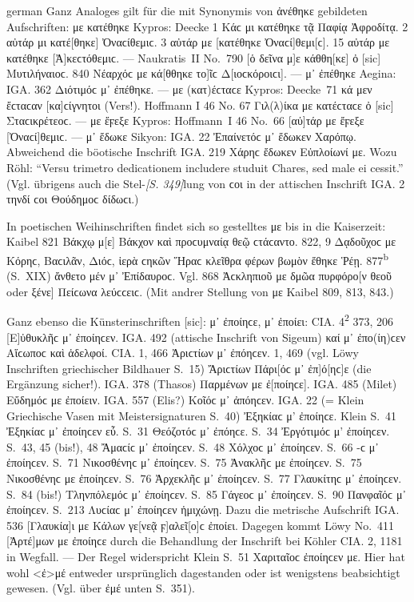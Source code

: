 \begin{otherlanguage*}{german}
Ganz Analoges gilt für die mit Synonymis von ἀνέθηκε gebildeten Aufschriften: με κατέθηκε Kypros: Deecke 1 Κάϲ μι κατέθηκε τᾷ Παφίᾳ Ἀφροδίτᾳ. 2 αὐτάρ μι κατέ[θηκε] Ὀναϲίθεμιϲ. 3 αὐτάρ με [κατέθηκε Ὀναϲί]θεμι[ϲ]. 15 αὐτάρ με κατέθηκε [Ἀ]κεϲτόθεμιϲ. — Naukratis~II No.~790 [ὁ δεῖνα μ]ε κάθθη[κε] ὀ [sic] Μυτιλήναιοϲ. 840 Νέαρχόϲ με κά[θθηκε το]ῖϲ Δ[ιοϲκόροιϲι]. — μ᾽ ἐπέθηκε Aegina: IGA. 362 Διότιμόϲ μ᾽ ἐπέθηκε. — με (κατ)έϲταϲε Kypros: \mbox{Deecke}~71 κά μεν ἔϲταϲαν [κα]ϲίγνη\-τοι (Vers!). Hoffmann I 46 No. 67 Γιλ(λ)ίκα με κατέϲταϲε ὀ [sic] Σταϲικρέτεοϲ. — με ἔϝεξε Kypros: Hoffmann~I 46 No.~66 [αὐ]τάρ με ἔϝεξε [Ὀναϲί]θεμιϲ. — μ᾽ ἔδωκε Sikyon: IGA. 22 Ἐπαίνετόϲ μ᾽ ἔδωκεν Χαρόπῳ. Abweichend die böotische Inschrift IGA. 219 Χάρηϲ ἔδωκεν Εὐπλοίωνί με. Wozu Röhl: “Versu trimetro dedicationem includere studuit Chares, sed male ei cessit.” (Vgl. übrigens auch die Stel-\hypertarget{p349}{\emph{[S. 349]}}\label{p349}lung von ϲοι in der attischen Inschrift IGA. 2 τηνδί ϲοι Θούδημοϲ δίδωϲι.)

In poetischen Weihinschriften findet sich so gestelltes με bis in die Kaiserzeit: Kaibel 821 Βάκχῳ μ[ε] Βάκχον καὶ προϲυμναίᾳ θεῷ ϲτάϲαντο. 822, 9 Δᾳδοῦχοϲ με Κόρηϲ, Βαϲιλᾶν, Διόϲ, ἱερὰ ϲηκῶν Ἥραϲ κλεῖθρα φέρων βωμὸν ἔθηκε Ῥέῃ. 877\textsuperscript{b} (S.~XIX) ἄνθετο μέν μ᾽ Ἐπίδαυροϲ. Vgl. 868 Ἀϲκληπιοῦ με δμῶα πυρφόρο[ν θεοῦ oder ξένε] Πείϲωνα λεύϲϲειϲ. (Mit andrer Stellung von με Kaibel 809, 813, 843.)

Ganz ebenso die Künsterinschriften [sic]: μ᾽ ἐποίηϲε, μ᾽ ἐποίει: CIA. 4\textsuperscript{2} 373, 206 [Ε]ὐθυκλῆϲ μ᾽ ἐποίηϲεν. IGA. 492 (attische Inschrift von Sigeum) καί μ᾽ ἐπο(ίη)ϲεν Αἵϲωποϲ καὶ ἁδελφοί. CIA. 1, 466 Ἀριϲτίων μ᾽ ἐπόηϲεν. 1, 469 (vgl. Löwy Inschriften griechischer Bildhauer S.~15) Ἄριϲτίων Πάρι[όϲ μ᾽ ἐπ]ό[ηϲ]ε (die Ergänzung sicher!). IGA. 378 (Thasos) Παρμένων με ἐ[ποίηϲε]. IGA. 485 (Milet) Εὔδημόϲ με ἐποίειν. IGA. 557 (Elis?) Κοῖόϲ μ᾽ ἀπόηϲεν. IGA. 22 (= Klein Griechische Vasen mit Meistersignaturen S.~40) Ἐξηκίαϲ μ’ ἐποίηϲε. Klein S.~41 Ἐξηκίαϲ μ᾽ ἐποίηϲεν εὖ. S.~31 Θεόζοτόϲ μ᾽ ἐπόηϲε. S.~34 Ἐργότιμόϲ μ’ ἐποίηϲεν. S.~43, 45 (bis!), 48 Ἄμαϲίϲ μ᾽ ἐποίηϲεν. S.~48 Χόλχοϲ μ᾽ ἐποίηϲεν. S.~66 -ϲ μ᾽ ἐποίηϲεν. S.~71 Νικοσθένηϲ μ᾽ ἐποίηϲεν. S.~75 Ἀνακλῆϲ με ἐποίηϲεν. S.~75 Νικοσθένηϲ με ἐποίηϲεν. S.~76 Ἀρχεκλῆϲ μ᾽ ἐποίηϲεν. S.~77 Γλαυκίτηϲ μ᾽ ἐποίηϲεν. S.~84 (bis!) Τληνπόλεμόϲ μ᾽ ἐποίηϲεν. S.~85 Γάγεοϲ μ᾽ ἐποίηϲεν. S.~90 Πανφαῖόϲ μ᾽ ἐποίηϲεν. S.~213 Λυϲίαϲ μ᾽ ἐποίηϲεν ἡμιχώνῃ. Dazu die metrische Aufschrift IGA. 536 [Γλαυκία]ι με Κάλων γε[νεᾷ ϝ]αλεῖ[ο]ϲ ἐποίει. Dagegen kommt Löwy No.~411 [Ἀρτέ]μων με ἐποίηϲε durch die Behandlung der Inschrift bei Köhler CIA. 2, 1181 in Wegfall. — Der Regel widerspricht Klein S.~51 Χαριταῖοϲ ἐποίηϲεν με. Hier hat wohl <ἐ>μέ entweder ursprünglich dagestanden oder ist wenigstens beabsichtigt gewesen. (Vgl. über ἐμέ unten S.~351).


\end{otherlanguage*}
